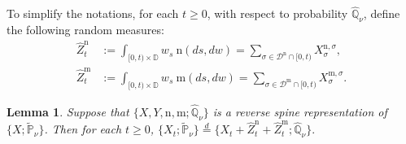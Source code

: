 \documentclass[12pt,a4paper]{amsart}
\numberwithin{equation}{section}
\theoremstyle{plain}
\newtheorem{lem}[thm]{Lemma}
\theoremstyle{definition}
\theoremstyle{remark}
\begin{document}
	To simplify the notations, for each $t\geq 0$, with respect to probability $\widehat{\mathbb Q}_\nu$, define the following random measures:
\[\begin{split}
	\widehat Z^{\mathrm n}_t
	&:= \int_{[0,t)\times \mathbb D} w_{s} ~\mathrm n (ds,dw)
	= \sum_{\sigma \in \mathcal D^\mathrm n \cap [0,t)} X^{\mathrm n,\sigma}_{\sigma},
	\\ \widehat Z^{\mathrm m}_t
	&:= \int_{[0,t)\times \mathbb D} w_{s} ~\mathrm m (ds,dw)
	= \sum_{\sigma \in \mathcal D^\mathrm m \cap [0,t)} X^{\mathrm m,\sigma}_{\sigma}.
\end{split}\]
\begin{lem}
	Suppose that $\{X, Y, \mathrm n, \mathrm m; \widehat{\mathbb Q}_{\nu}\}$ is a reverse spine representation of $\{X; \widetilde {\mathbb P}_\nu\}$.
	Then for each $t\geq 0$,
$
	\{X_t; \widetilde{\mathbb P}_\nu\}
	\overset{d}{=}
	\{X_t + \widehat Z^{\mathrm n}_{t} + \widehat Z^{\mathrm m}_{t}; \widehat{\mathbb Q}_\nu\}.
$
\end{lem}
\end{document}
